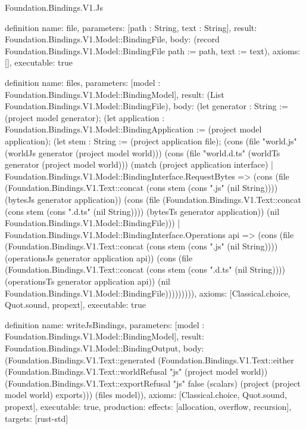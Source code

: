 \begin{lexlean}{Foundation.Bindings.V1.Js}
\begin{semanticmodule}
definition{
  name: file,
  parameters: [path : String, text : String],
  result: Foundation.Bindings.V1.Model::BindingFile,
  body: (record Foundation.Bindings.V1.Model::BindingFile {path := path, text := text}),
  axioms: [],
  executable: true
}

definition{
  name: files,
  parameters: [model : Foundation.Bindings.V1.Model::BindingModel],
  result: (List Foundation.Bindings.V1.Model::BindingFile),
  body: (let generator : String := (project model generator); (let application : Foundation.Bindings.V1.Model::BindingApplication := (project model application); (let stem : String := (project application file); (cons (file "world.js" (worldJs generator (project model world))) (cons (file "world.d.ts" (worldTs generator (project model world))) (match (project application interface)
    | Foundation.Bindings.V1.Model::BindingInterface.RequestBytes => (cons (file (Foundation.Bindings.V1.Text::concat (cons stem (cons ".js" (nil String)))) (bytesJs generator application)) (cons (file (Foundation.Bindings.V1.Text::concat (cons stem (cons ".d.ts" (nil String)))) (bytesTs generator application)) (nil Foundation.Bindings.V1.Model::BindingFile)))
    | Foundation.Bindings.V1.Model::BindingInterface.Operations api => (cons (file (Foundation.Bindings.V1.Text::concat (cons stem (cons ".js" (nil String)))) (operationsJs generator application api)) (cons (file (Foundation.Bindings.V1.Text::concat (cons stem (cons ".d.ts" (nil String)))) (operationsTs generator application api)) (nil Foundation.Bindings.V1.Model::BindingFile))))))))),
  axioms: [Classical.choice, Quot.sound, propext],
  executable: true
}

definition{
  name: writeJsBindings,
  parameters: [model : Foundation.Bindings.V1.Model::BindingModel],
  result: Foundation.Bindings.V1.Model::BindingOutput,
  body: (Foundation.Bindings.V1.Text::generated (Foundation.Bindings.V1.Text::either (Foundation.Bindings.V1.Text::worldRefusal "js" (project model world)) (Foundation.Bindings.V1.Text::exportRefusal "js" false (scalars) (project (project model world) exports))) (files model)),
  axioms: [Classical.choice, Quot.sound, propext],
  executable: true,
  production: {effects: [allocation, overflow, recursion], targets: [rust-std]}
}
\end{semanticmodule}
\end{lexlean}
